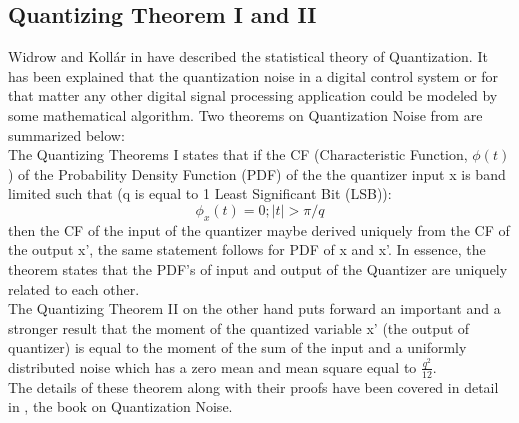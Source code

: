 \documentclass[colorlinks=true,pdfstartview=FitV,linkcolor=blue,
            citecolor=red,urlcolor=magenta]{ligodoc}
\begin{document}
\subsection{Quantizing Theorem I and II} Widrow and Koll\'ar in \cite{Kollar} have described the statistical theory of Quantization. It has been explained that the quantization noise in a digital control system or for that matter any other digital signal processing application could be modeled by some mathematical algorithm. Two theorems on Quantization Noise from \cite{Kollar} are summarized below:\\
The Quantizing Theorems I states that if the CF (Characteristic Function, $\phi(t)$) of the Probability Density Function (PDF) of the the quantizer input x is band limited such that (q is equal to 1 Least Significant Bit (LSB)):
	\begin{equation}
		\phi_x(t) = 0 ; |t| >\pi/q  
	\end{equation}
then the CF of the input of the quantizer maybe derived uniquely from the CF of the output x', the same statement follows for PDF of x and x'. In essence, the theorem states that the PDF's of input and output of the Quantizer are uniquely related to each other.\\
The Quantizing Theorem II on the other hand puts forward an important and a stronger result that the moment of the quantized variable x' (the output of quantizer) is equal to the moment of the sum of the input and a uniformly distributed noise which has a zero mean and mean square equal to $\frac{q^{2}}{12}$. \\
The details of these theorem along with their proofs have been covered in detail in \cite{Kollar}, the book on Quantization Noise.
\end{document}
